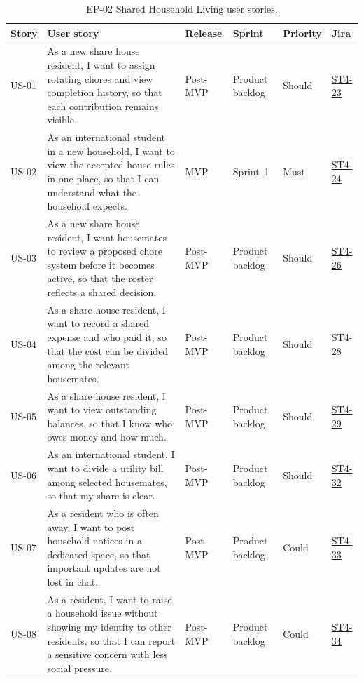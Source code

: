 \documentclass[11pt,a4paper]{article}
\begin{document}
\begin{table}[H]
    \centering
    \footnotesize
    \caption{EP-02 Shared Household Living user stories.}
    \begin{tabularx}{\textwidth}{@{}L{1.05cm}Y L{1.75cm}L{1.7cm}L{1.2cm}L{1.1cm}@{}}
        \toprule
        Story & User story & Release & Sprint & Priority & Jira\\
        \midrule
        US-01 & As a new share house resident, I want to assign rotating chores and view completion history, so that each contribution remains visible. & Post-MVP & Product backlog & Should & \href{https://unsw-team-desn-seng2026.atlassian.net/browse/ST4-23}{ST4-23}\\
        US-02 & As an international student in a new household, I want to view the accepted house rules in one place, so that I can understand what the household expects. & MVP & Sprint~1 & Must & \href{https://unsw-team-desn-seng2026.atlassian.net/browse/ST4-24}{ST4-24}\\
        US-03 & As a new share house resident, I want housemates to review a proposed chore system before it becomes active, so that the roster reflects a shared decision. & Post-MVP & Product backlog & Should & \href{https://unsw-team-desn-seng2026.atlassian.net/browse/ST4-26}{ST4-26}\\
        US-04 & As a share house resident, I want to record a shared expense and who paid it, so that the cost can be divided among the relevant housemates. & Post-MVP & Product backlog & Should & \href{https://unsw-team-desn-seng2026.atlassian.net/browse/ST4-28}{ST4-28}\\
        US-05 & As a share house resident, I want to view outstanding balances, so that I know who owes money and how much. & Post-MVP & Product backlog & Should & \href{https://unsw-team-desn-seng2026.atlassian.net/browse/ST4-29}{ST4-29}\\
        US-06 & As an international student, I want to divide a utility bill among selected housemates, so that my share is clear. & Post-MVP & Product backlog & Should & \href{https://unsw-team-desn-seng2026.atlassian.net/browse/ST4-32}{ST4-32}\\
        US-07 & As a resident who is often away, I want to post household notices in a dedicated space, so that important updates are not lost in chat. & Post-MVP & Product backlog & Could & \href{https://unsw-team-desn-seng2026.atlassian.net/browse/ST4-33}{ST4-33}\\
        US-08 & As a resident, I want to raise a household issue without showing my identity to other residents, so that I can report a sensitive concern with less social pressure. & Post-MVP & Product backlog & Could & \href{https://unsw-team-desn-seng2026.atlassian.net/browse/ST4-34}{ST4-34}\\

\end{tabularx}
\end{table}
\end{document}
